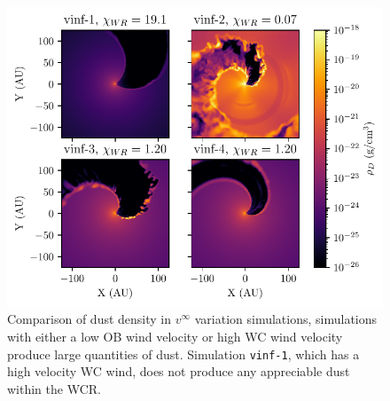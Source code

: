 

\begin{figure}
  \centering
  \includegraphics{assets/results/vinf/vinf-finished-rhod.pdf}
  \caption[Dust density comparison of terminal velocity varying systems]{Comparison of dust density in $v^\infty$ variation simulations, simulations with either a low OB wind velocity or high WC wind velocity produce large quantities of dust. Simulation \texttt{vinf-1}, which has a high velocity WC wind, does not produce any appreciable dust within the WCR.}
  \label{fig:vinfrhodcomp}
\end{figure}

